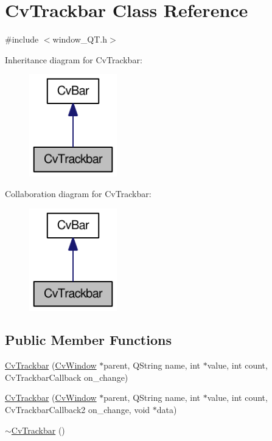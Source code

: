 \hypertarget{classCvTrackbar}{
\section{CvTrackbar Class Reference}
\label{classCvTrackbar}
}


{\ttfamily \#include $<$window\_\-QT.h$>$}



Inheritance diagram for CvTrackbar:\nopagebreak
\begin{figure}[H]
\begin{center}
\leavevmode
\includegraphics[width=108pt]{classCvTrackbar__inherit__graph}
\end{center}
\end{figure}


Collaboration diagram for CvTrackbar:\nopagebreak
\begin{figure}[H]
\begin{center}
\leavevmode
\includegraphics[width=108pt]{classCvTrackbar__coll__graph}
\end{center}
\end{figure}
\subsection*{Public Member Functions}
\begin{DoxyCompactItemize}
\item 
\hyperlink{classCvTrackbar_a5666e87ce86ec7ad97d62b89d148e9bb}{CvTrackbar} (\hyperlink{classCvWindow}{CvWindow} $\ast$parent, QString name, int $\ast$value, int count, CvTrackbarCallback on\_\-change)
\item 
\hyperlink{classCvTrackbar_a36624a0a15c46a3320ce29f20eda8db8}{CvTrackbar} (\hyperlink{classCvWindow}{CvWindow} $\ast$parent, QString name, int $\ast$value, int count, CvTrackbarCallback2 on\_\-change, void $\ast$data)
\item 
\hyperlink{classCvTrackbar_ae9bcf438807648149bc24d64d9294ac9}{$\sim$CvTrackbar} ()
\end{DoxyCompactItemize}
